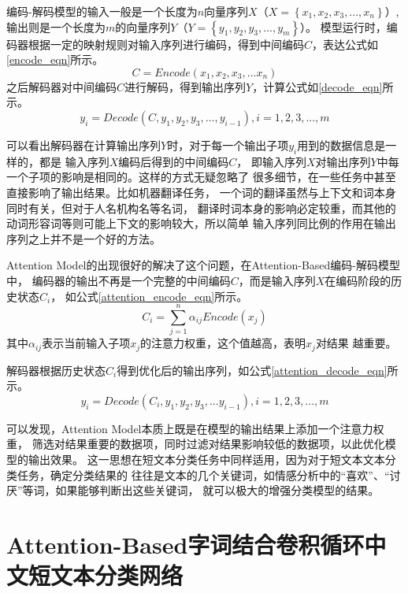 编码-解码模型的输入一般是一个长度为$n$向量序列$X$（$X= \left \{x_1,x_2,x_3,...,x_n \right \}$）,
输出则是一个长度为$m$的向量序列$Y$（$Y= \left \{y_1,y_2,y_3,...,y_m \right \}$）。
模型运行时，编码器根据一定的映射规则对输入序列进行编码，得到中间编码$C$，表达公式如\ref{encode_eqn}所示。
\begin{equation}
    C=Encode\left ( x_1,x_2,x_3,...x_n \right )
    \label{encode_eqn}
\end{equation}
之后解码器对中间编码$C$进行解码，得到输出序列$Y$，计算公式如\ref{decode_eqn}所示。
\begin{equation}
    y_i=Decode\left ( C,y_1,y_2,y_3,...,y_{i-1} \right ),i=1,2,3,...,m
    \label{decode_eqn}
\end{equation}

可以看出解码器在计算输出序列$Y$时，对于每一个输出子项$y_i$用到的数据信息是一样的，都是
输入序列$X$编码后得到的中间编码$C$，
即输入序列$X$对输出序列$Y$中每一个子项的影响是相同的。这样的方式无疑忽略了
很多细节，在一些任务中甚至直接影响了输出结果。比如机器翻译任务，
一个词的翻译虽然与上下文和词本身同时有关，但对于人名机构名等名词，
翻译时词本身的影响必定较重，而其他的动词形容词等则可能上下文的影响较大，所以简单
输入序列同比例的作用在输出序列之上并不是一个好的方法。

Attention Model的出现很好的解决了这个问题，在Attention-Based编码-解码模型中，
编码器的输出不再是一个完整的中间编码$C$，而是输入序列$X$在编码阶段的历史状态$C_i$，
如公式\ref{attention_encode_eqn}所示。
\begin{equation}
    C_i=\sum_{j=1}^{n}\alpha_{ij}Encode\left ( x_j \right )
    \label{attention_encode_eqn}
\end{equation}
其中$\alpha_{ij}$表示当前输入子项$x_j$的注意力权重，这个值越高，表明$x_j$对结果
越重要。

解码器根据历史状态$C_i$得到优化后的输出序列，如公式\ref{attention_decode_eqn}所示。
\begin{equation}
    y_i=Decode\left ( C_i,y_1,y_2,y_3,...y_{i-1} \right ),i=1,2,3,...,m
    \label{attention_decode_eqn}
\end{equation}

可以发现，Attention Model本质上既是在模型的输出结果上添加一个注意力权重，
筛选对结果重要的数据项，同时过滤对结果影响较低的数据项，以此优化模型的输出效果。
这一思想在短文本分类任务中同样适用，因为对于短文本文本分类任务，确定分类结果的
往往是文本的几个关键词，如情感分析中的“喜欢”、“讨厌”等词，如果能够判断出这些关键词，
就可以极大的增强分类模型的结果。

\section{Attention-Based字词结合卷积循环中文短文本分类网络}
